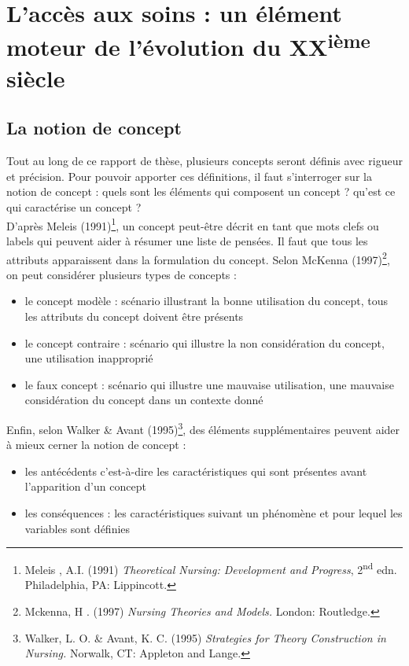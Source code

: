 \section{L'accès aux soins : un élément moteur de l'évolution du XX\textsuperscript{ième} siècle}

\subsection{La notion de concept}

Tout au long de ce rapport de thèse, plusieurs concepts seront définis avec rigueur et précision. Pour pouvoir apporter ces définitions, il faut s'interroger sur la notion de concept : quels sont les éléments qui composent un concept ? qu'est ce qui caractérise un concept ?\\
D'après Meleis (1991)\footnote{Meleis , A.I. (1991) \textit{Theoretical Nursing: Development and Progress}, 2\textsuperscript{nd} edn. Philadelphia, PA: Lippincott.}, un concept peut-être décrit en tant que mots clefs ou labels qui peuvent aider à résumer une liste de pensées. Il faut que tous les attributs apparaissent dans la formulation du concept.
Selon McKenna (1997)\footnote{Mckenna, H . (1997) \textit{Nursing Theories and Models.} London: Routledge.}, on peut considérer plusieurs types de concepts : 
\begin{itemize}
\item le concept modèle : scénario illustrant la bonne utilisation du concept, tous les attributs du concept doivent être présents
\item le concept contraire : scénario qui illustre la non considération du concept, une utilisation inapproprié
\item le faux concept : scénario qui illustre une mauvaise utilisation, une mauvaise considération du concept dans un contexte donné
\end{itemize}

Enfin, selon Walker \& Avant (1995)\footnote{Walker, L. O. \& Avant, K. C. (1995) \textit{Strategies for Theory Construction in Nursing.} Norwalk, CT: Appleton and Lange.}, des éléments supplémentaires peuvent aider à mieux cerner la notion de concept : 
\begin{itemize}
\item les antécédents c'est-à-dire les caractéristiques qui sont présentes avant l'apparition d'un concept
\item les conséquences : les caractéristiques suivant un phénomène et pour lequel les variables sont définies
\end{itemize}

